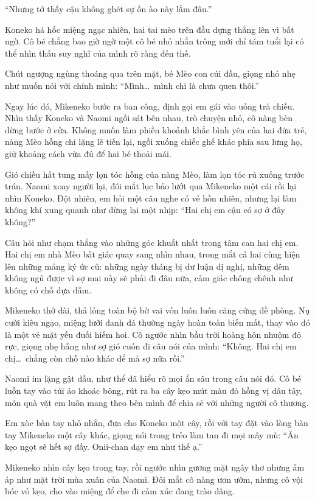 ﻿\documentclass[../main.tex]{subfiles}
\begin{document}
``Nhưng tớ thấy cậu không ghét sự ồn ào này lắm đâu.''

Koneko há hốc miệng ngạc nhiên, hai tai mèo trên đầu dựng thẳng lên vì bất ngờ. Cô bé chẳng bao giờ ngờ một cô bé nhỏ nhắn trông mới chỉ tám tuổi lại có thể nhìn thấu suy nghĩ của mình rõ ràng đến thế.

Chút ngượng ngùng thoáng qua trên mặt, bé Mèo con cúi đầu, giọng nhỏ nhẹ như muốn nói với chính mình: ``Mình\dots\ mình chỉ là chưa quen thôi.''

Ngay lúc đó, Mikeneko bước ra ban công, định gọi em gái vào uống trà chiều. Nhìn thấy Koneko và Naomi ngồi sát bên nhau, trò chuyện nhỏ, cô nàng bèn dừng bước ở cửa. Không muốn làm phiền khoảnh khắc bình yên của hai đứa trẻ, nàng Mèo hồng chỉ lặng lẽ tiến lại, ngồi xuống chiếc ghế khác phía sau lưng họ, giữ khoảng cách vừa đủ để hai bé thoải mái.

Gió chiều hất tung mấy lọn tóc hồng của nàng Mèo, làm lọn tóc rủ xuống trước trán. Naomi xoay người lại, đôi mắt lục bảo lướt qua Mikeneko một cái rồi lại nhìn Koneko. Đột nhiên, em hỏi một câu nghe có vẻ hồn nhiên, nhưng lại làm không khí xung quanh như dừng lại một nhịp: ``Hai chị em cậu có sợ ở đây không?''

Câu hỏi như chạm thẳng vào những góc khuất nhất trong tâm can hai chị em. Hai chị em nhà Mèo bất giác quay sang nhìn nhau, trong mắt cả hai cùng hiện lên những mảng ký ức cũ: những ngày tháng bị dư luận dị nghị, những đêm không ngủ được vì sợ mai này sẽ phải đi đâu nữa, cảm giác chông chênh như không có chỗ dựa dẫm.

Mikeneko thở dài, thả lỏng toàn bộ bờ vai vốn luôn luôn căng cứng đề phòng. Nụ cười kiêu ngạo, miệng lưỡi đanh đá thường ngày hoàn toàn biến mất, thay vào đó là một vẻ mặt yếu đuối hiếm hoi. Cô ngước nhìn bầu trời hoàng hôn nhuộm đỏ rực, giọng nhẹ hẫng như sợ gió cuốn đi câu nói của mình: ``Không. Hai chị em chị\dots\ chẳng còn chỗ nào khác để mà sợ nữa rồi.''

Naomi im lặng gật đầu, như thể đã hiểu rõ mọi ẩn sâu trong câu nói đó. Cô bé luồn tay vào túi áo khoác bông, rút ra ba cây kẹo mút màu đỏ hồng vị dâu tây, món quà vặt em luôn mang theo bên mình để chia sẻ với những người cô thương.

Em xòe bàn tay nhỏ nhắn, đưa cho Koneko một cây, rồi với tay đặt vào lòng bàn tay Mikeneko một cây khác, giọng nói trong trẻo làm tan đi mọi mây mù: ``Ăn kẹo ngọt sẽ hết sợ đấy. Onii-chan dạy em như thế ạ.''

Mikeneko nhìn cây kẹo trong tay, rồi ngước nhìn gương mặt ngây thơ nhưng ấm áp như mặt trời mùa xuân của Naomi. Đôi mắt cô nàng ươn ướm, nhưng cô vội bóc vỏ kẹo, cho vào miệng để che đi cảm xúc đang trào dâng.
\end{document}
